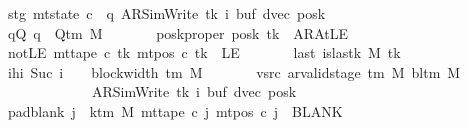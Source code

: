 \begin{isabellebody}
\ \ \ \ \ \ \ stg{\isacharcolon}{\kern0pt}\ {\isachardoublequoteopen}mt{\isacharunderscore}{\kern0pt}state\ c{\isacharprime}{\kern0pt}\ {\isacharequal}{\kern0pt}\ {\isacharparenleft}{\kern0pt}q{\isacharcomma}{\kern0pt}\ AR{\isacharunderscore}{\kern0pt}SimWrite{\isacharcomma}{\kern0pt}\ tk{\isacharcomma}{\kern0pt}\ i{\isacharcomma}{\kern0pt}\ buf{\isacharcomma}{\kern0pt}\ dvec{\isacharcomma}{\kern0pt}\ posk{\isacharparenright}{\kern0pt}{\isachardoublequoteclose}\isanewline
\ \ \ \ \ \ \ qQ{\isacharcolon}{\kern0pt}\ {\isachardoublequoteopen}q\ {\isasymin}\ Q{\isacharunderscore}{\kern0pt}tm\ M{\isachardoublequoteclose}\isanewline
\ \ \ \ \ \ \ poskproper{\isacharcolon}{\kern0pt}\ {\isachardoublequoteopen}posk\ tk\ {\isasymnoteq}\ AR{\isacharunderscore}{\kern0pt}AtLE{\isachardoublequoteclose}\isanewline
\ \ \ \ \ \ \ notLE{\isacharcolon}{\kern0pt}\ {\isachardoublequoteopen}mt{\isacharunderscore}{\kern0pt}tape\ c{\isacharprime}{\kern0pt}\ tk\ {\isacharparenleft}{\kern0pt}mt{\isacharunderscore}{\kern0pt}pos\ c{\isacharprime}{\kern0pt}\ tk{\isacharparenright}{\kern0pt}\ {\isasymnoteq}\ LE{}{\isachardoublequoteclose}\isanewline
\ \ \ \ \ \ \ last{\isacharcolon}{\kern0pt}\ {\isachardoublequoteopen}is{\isacharunderscore}{\kern0pt}last{\isacharunderscore}{\kern0pt}k\ M\ tk{\isachardoublequoteclose}\isanewline
\ \ \ \ \ \ \ ihi{\isacharcolon}{\kern0pt}\ {\isachardoublequoteopen}Suc\ i\ {\isacharequal}{\kern0pt}\ {}\ {\isacharasterisk}{\kern0pt}\ block{\isacharunderscore}{\kern0pt}width\ {\isacharparenleft}{\kern0pt}{\isasymGamma}{\isacharunderscore}{\kern0pt}tm\ M{\isacharparenright}{\kern0pt}{\isachardoublequoteclose}\isanewline
\ \ \ \ \ \ \ vsrc{\isacharcolon}{\kern0pt}\ {\isachardoublequoteopen}ar{\isacharunderscore}{\kern0pt}valid{\isacharunderscore}{\kern0pt}stage\ {\isacharparenleft}{\kern0pt}{\isasymGamma}{\isacharunderscore}{\kern0pt}tm\ M{\isacharparenright}{\kern0pt}\ {\isacharparenleft}{\kern0pt}bl{\isacharunderscore}{\kern0pt}tm\ M{\isacharparenright}{\kern0pt}\isanewline
\ \ \ \ \ \ \ \ \ \ \ \ \ \ \ \ \ \ \ {\isacharparenleft}{\kern0pt}AR{\isacharunderscore}{\kern0pt}SimWrite{\isacharcomma}{\kern0pt}\ tk{\isacharcomma}{\kern0pt}\ i{\isacharcomma}{\kern0pt}\ buf{\isacharcomma}{\kern0pt}\ dvec{\isacharcomma}{\kern0pt}\ posk{\isacharparenright}{\kern0pt}{\isachardoublequoteclose}\isanewline
\ \ \ \ \ \ \ pad{\isacharunderscore}{\kern0pt}blank{\isacharcolon}{\kern0pt}\ {\isachardoublequoteopen}{\isasymforall}j\ {\isasymge}\ k{\isacharunderscore}{\kern0pt}tm\ M{\isachardot}{\kern0pt}\ mt{\isacharunderscore}{\kern0pt}tape\ c{\isacharprime}{\kern0pt}\ j\ {\isacharparenleft}{\kern0pt}mt{\isacharunderscore}{\kern0pt}pos\ c{\isacharprime}{\kern0pt}\ j{\isacharparenright}{\kern0pt}\ {\isacharequal}{\kern0pt}\ BLANK{}{\isachardoublequoteclose}\isanewline

\end{isabellebody}
